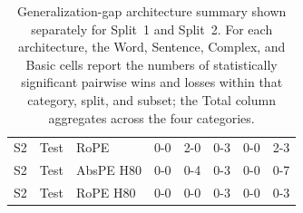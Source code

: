 \begin{table}[t]
\begin{tabular}{@{}lllccccc@{}}
S2 & Test & RoPE & 0-0 & 2-0 & 0-3 & 0-0 & 2-3 \\
S2 & Test & AbsPE H80 & 0-0 & 0-4 & 0-3 & 0-0 & 0-7 \\
S2 & Test & RoPE H80 & 0-0 & 0-0 & 0-3 & 0-0 & 0-3 \\
\bottomrule
\end{tabular}
\caption{\small Generalization-gap architecture summary shown separately for Split~1 and Split~2. For each architecture, the Word, Sentence, Complex, and Basic cells report the numbers of statistically significant pairwise wins and losses within that category, split, and subset; the Total column aggregates across the four categories.}
\label{tab:gap_per_split_arch_dominance}
\end{table}
